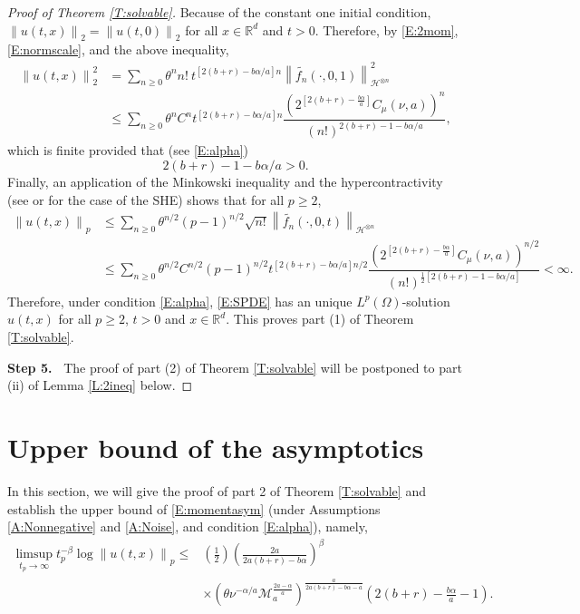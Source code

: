 \documentclass[a4paper,11pt]{article}
\numberwithin{equation}{section}
\numberwithin{equation}{section}
\theoremstyle{plain}
\theoremstyle{definition}
\newcommand{\Norm}[1]{\left\|  #1   \right\|}
\newcommand{\R}{\mathbb{R}}
\begin{document}
\begin{proof}[Proof of Theorem \ref{T:solvable}]
  Because of the constant one initial condition, $\Norm{u(t,x)}_2 =\Norm{u(t,0)}_2$ for all $x \in
  \R^d$ and $t>0$. Therefore, by \eqref{E:2mom}, \eqref{E:normscale}, and the above inequality,
  \begin{align}
    \nonumber
    \Norm{u(t,x)}_2^2
    & = \sum_{n \ge 0} \theta^n n! \: t^{[2(b + r ) -b \alpha / a]n}  \Norm{ \widetilde{f_n}(\cdot,0,1) }_{ \mathcal{H}^{\otimes n} }^2 \\
    & \le \sum_{n \ge 0} \theta^n C^n t^{[2(b + r ) -b \alpha / a]n} \dfrac{ \left(2^{ \left[ 2(b+r)- \frac{b \alpha}{a} \right]}C_\mu(\nu, a) \right)^n }{ (n!)^{ 2(b+r) - 1 - b\alpha/a }},
    \label{E:2nomBd}
  \end{align}
  which is finite provided that (see \eqref{E:alpha})
  \begin{equation} \label{E:alpha4}
    2(b+r) - 1 - b\alpha/a > 0.
  \end{equation}
  Finally, an application of the Minkowski inequality and the hypercontractivity (see \cite[Theorem
  B.1]{BCC21} or \cite{Le16} for the case of the SHE) shows that for all $p\ge 2$,
  \begin{align}
    \nonumber
    \Norm{u(t,x)}_p
    & \le \sum_{n\ge 0} \theta^{n/2} (p-1)^{n/2} \sqrt{n!} \Norm{\widetilde{f_n}(\cdot,0,t) }_{ \mathcal{H}^{\otimes n} } \\
    & \le \sum_{n \ge 0} \theta^{n/2} C^{n/2} (p-1)^{n/2}  t^{[2(b + r ) -b \alpha /a]n/2}
    \dfrac{\left(2^{ \left[ 2(b+r)- \frac{b \alpha}{a} \right]}C_\mu(\nu, a) \right)^{n/2} }{ (n!)^{\frac{1}{2}\left[ 2(b+r) - 1 - b\alpha/a \right]}} < \infty.
    \label{E:pmomBd}
  \end{align}
  Therefore, under condition \eqref{E:alpha}, \eqref{E:SPDE} has an unique $L^p(\Omega)$-solution
  $u(t,x)$ for all $p\ge 2$, $t>0$ and $x\in\R^d$.  This proves part (1) of Theorem
  \ref{T:solvable}.%

  {\bigskip\bf\noindent Step 5.~}%
  The proof of part (2) of Theorem \ref{T:solvable} will be postponed to part (ii) of Lemma
  \ref{L:2ineq} below.%
\end{proof}

\section{Upper bound of the asymptotics} \label{S:upperbd}

In this section, we will give the proof of part 2 of Theorem \ref{T:solvable} and establish the
upper bound of \eqref{E:momentasym} (under Assumptions \ref{A:Nonnegative} and \ref{A:Noise}, and
condition \eqref{E:alpha}), namely,
\begin{equation} \label{E:momentasym-upper}
  \begin{aligned}
    \limsup_{t_p \to \infty} t_p^{-\beta} \log \Norm{u(t,x)}_p \le
    & \left(\frac{1}{2}\right)\left(\frac{2a}{2a(b+r)- b\alpha} \right)^\beta \\
    & \times \left(\theta\nu^{-\alpha/a} \mathcal{M}_a^{\frac{2a-\alpha}{a}}\right)^{\frac{a}{2a(b+r)-b\alpha-a}}\left(2(b+r)-\frac{b\alpha}{a}-1\right).
  \end{aligned}
\end{equation}
\end{document}
